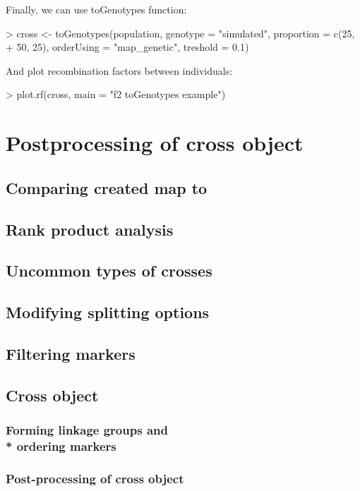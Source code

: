 \documentclass{article}
\begin{document}
\newpage
{\noindent}Finally, we can use toGenotypes function:
\begin{Schunk}
\begin{Sinput}
> cross <- toGenotypes(population, genotype = "simulated", proportion = c(25, 
+     50, 25), orderUsing = "map_genetic", treshold = 0.1)
\end{Sinput}
\end{Schunk}

{\noindent}And plot recombination factors between individuals:
\begin{Schunk}
\begin{Sinput}
> plot.rf(cross, main = "f2 toGenotypes example")
\end{Sinput}
\end{Schunk}

\newpage
\section{Postprocessing of cross object}

\subsection{Comparing created map to }
\blindtext
\subsection{Rank product analysis}
\blindtext
\subsection{Uncommon types of crosses}
\blindtext
\subsection{Modifying splitting options}
\blindtext
\subsection{Filtering markers}
\blindtext
\subsection{Cross object}
\blindtext
\subsubsection{Forming linkage groups and \\* ordering markers}
\blindtext
\subsubsection{Post-processing of cross object}
\blindtext
\end{document}

